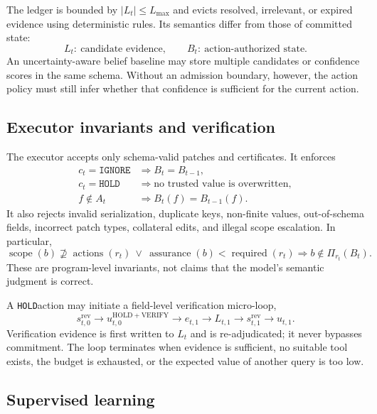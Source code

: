 \documentclass{article}
\newcommand{\hold}{\texttt{HOLD}}
\newcommand{\ignore}{\texttt{IGNORE}}
\newcommand{\actions}{\operatorname{actions}}
\newcommand{\required}{\operatorname{required}}
\newcommand{\scope}{\operatorname{scope}}
\newcommand{\assurance}{\operatorname{assurance}}
\begin{document}
The ledger is bounded by $|L_t|\leq L_{\max}$ and evicts resolved, irrelevant, or expired evidence using deterministic rules. Its semantics differ from those of committed state:
\begin{equation}
L_t:\ \text{candidate evidence},\qquad
B_t:\ \text{action-authorized state}.
\end{equation}
An uncertainty-aware belief baseline may store multiple candidates or confidence scores in the same schema. Without an admission boundary, however, the action policy must still infer whether that confidence is sufficient for the current action.

\subsection{Executor invariants and verification}

The executor accepts only schema-valid patches and certificates. It enforces
\begin{align}
c_t=\ignore&\Rightarrow B_t=B_{t-1},\\
c_t=\hold&\Rightarrow\text{no trusted value is overwritten},\\
f\notin A_t&\Rightarrow B_t(f)=B_{t-1}(f).
\end{align}
It also rejects invalid serialization, duplicate keys, non-finite values, out-of-schema fields, incorrect patch types, collateral edits, and illegal scope escalation. In particular,
\begin{equation}
\scope(b)\not\supseteq\actions(r_t)\ \lor\ 
\assurance(b)<\required(r_t)
\Rightarrow b\notin\Pi_{r_t}(B_t).
\end{equation}
These are program-level invariants, not claims that the model's semantic judgment is correct.

A \hold action may initiate a field-level verification micro-loop,
\begin{equation}
s_{t,0}^{\mathrm{rev}}\rightarrow u_{t,0}^{\mathrm{HOLD+VERIFY}}
\rightarrow e_{t,1}\rightarrow L_{t,1}\rightarrow s_{t,1}^{\mathrm{rev}}\rightarrow u_{t,1}.
\end{equation}
Verification evidence is first written to $L_t$ and is re-adjudicated; it never bypasses commitment. The loop terminates when evidence is sufficient, no suitable tool exists, the budget is exhausted, or the expected value of another query is too low.

\subsection{Supervised learning}
\end{document}
